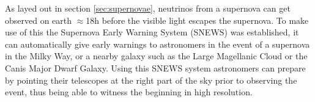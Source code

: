 As layed out in section \ref{sec:supernovae}, neutrinos from a supernova can
get observed on earth $\approx$18h before the visible light escapes the
supernova. To make use of this the Supernova Early Warning System
(SNEWS)\cite{SNEWS} was established, it can automatically give early warnings
to astronomers in the event of a supernova in the Milky Way, or a nearby galaxy
such as the Large Magellanic Cloud or the Canis Major Dwarf Galaxy.  Using this
SNEWS system astronomers can prepare by pointing their telescopes at the right
part of the sky prior to observing the event, thus being able to witness the
beginning in high resolution.
